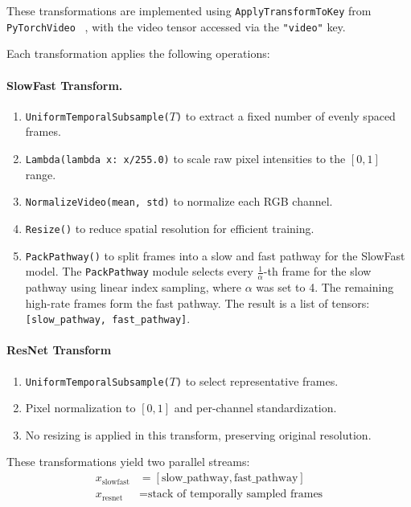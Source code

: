 These transformations are implemented using \texttt{ApplyTransformToKey} from \texttt{PyTorchVideo} ~\cite{fan2021pytorchvideodeeplearninglibrary}, with the video tensor accessed via the \texttt{"video"} key. 

Each transformation applies the following operations:

\paragraph{SlowFast Transform.}
\begin{enumerate}
    \item \texttt{UniformTemporalSubsample($T$)} to extract a fixed number of evenly spaced frames.
    \item \texttt{Lambda(lambda x: x/255.0)} to scale raw pixel intensities to the $[0, 1]$ range.
    \item \texttt{NormalizeVideo(mean, std)} to normalize each RGB channel.
    \item \texttt{Resize()} to reduce spatial resolution for efficient training.
    \item \texttt{PackPathway()} to split frames into a slow and fast pathway for the SlowFast model. The \texttt{PackPathway} module selects every $\frac{1}{\alpha}$-th frame for the slow pathway using linear index sampling, where $\alpha$ was set to 4. The remaining high-rate frames form the fast pathway. The result is a list of tensors: \texttt{[slow\_pathway, fast\_pathway]}.
\end{enumerate}

\paragraph{ResNet Transform}
\begin{enumerate}
    \item \texttt{UniformTemporalSubsample($T$)} to select representative frames.
    \item Pixel normalization to $[0,1]$ and per-channel standardization.
    \item No resizing is applied in this transform, preserving original resolution.
\end{enumerate}

These transformations yield two parallel streams:
\begin{align*}
x_{\text{slowfast}} &= [\text{slow\_pathway}, \text{fast\_pathway}] \\
x_{\text{resnet}}   &= \text{stack of temporally sampled frames}
\end{align*}

